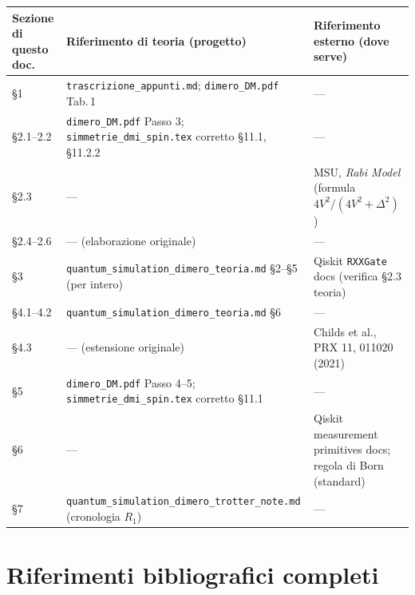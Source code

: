 \documentclass[11pt,a4paper]{article}
\begin{document}
\begin{center}
\begin{tabular}{@{}p{2.4cm}p{5.6cm}p{6.2cm}@{}}
\toprule
Sezione di questo doc.\ & Riferimento di teoria (progetto) & Riferimento esterno (dove serve) \\
\midrule
\S1 & \texttt{trascrizione\_appunti.md}; \texttt{dimero\_DM.pdf} Tab.\,1 & --- \\
\S2.1--2.2 & \texttt{dimero\_DM.pdf} Passo 3; \texttt{simmetrie\_dmi\_spin.tex} corretto \S11.1, \S11.2.2 & --- \\
\S2.3 & --- & MSU, \emph{Rabi Model} (formula $4V^2/(4V^2+\Delta^2)$) \\
\S2.4--2.6 & --- (elaborazione originale) & --- \\
\S3 & \texttt{quantum\_simulation\_dimero\_teoria.md} \S2--\S5 (per intero) & Qiskit \texttt{RXXGate} docs (verifica \S2.3 teoria) \\
\S4.1--4.2 & \texttt{quantum\_simulation\_dimero\_teoria.md} \S6 & --- \\
\S4.3 & --- (estensione originale) & Childs et al., PRX 11, 011020 (2021) \\
\S5 & \texttt{dimero\_DM.pdf} Passo 4--5; \texttt{simmetrie\_dmi\_spin.tex} corretto \S11.1 & --- \\
\S6 & --- & Qiskit measurement primitives docs; regola di Born (standard) \\
\S7 & \texttt{quantum\_simulation\_dimero\_trotter\_note.md} (cronologia $R_1$) & --- \\
\bottomrule
\end{tabular}
\end{center}

\section*{Riferimenti bibliografici completi}
\end{document}
